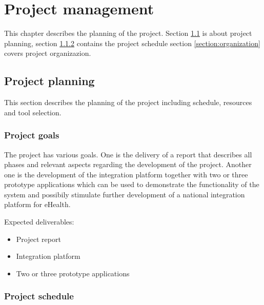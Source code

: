 \chapter{Project management}

\label{ch:management}


\nocite{Sommerville9}


This chapter describes the planning of the project. Section \ref{section:planning} is about project planning,
section \ref{section:schedule} contains the project schedule
section \ref{section:organization} covers project organizazion.

\section{Project planning}
\label{section:planning}
This section describes the planning of the project including schedule, resources and tool selection.

\subsection{Project goals}
The project has various goals. One is the delivery of a report that describes all phases and relevant aspects regarding the development of the project. Another one is the development of the integration platform together with two or three prototype applications which can be used to demonstrate the functionality of the system and possibily stimulate further development of a national integration platform for eHealth.

Expected deliverables:

\begin{itemize}
\item Project report
\item Integration platform
\item Two or three prototype applications
\end{itemize}


\subsection{Project schedule}
\label{section:schedule}

